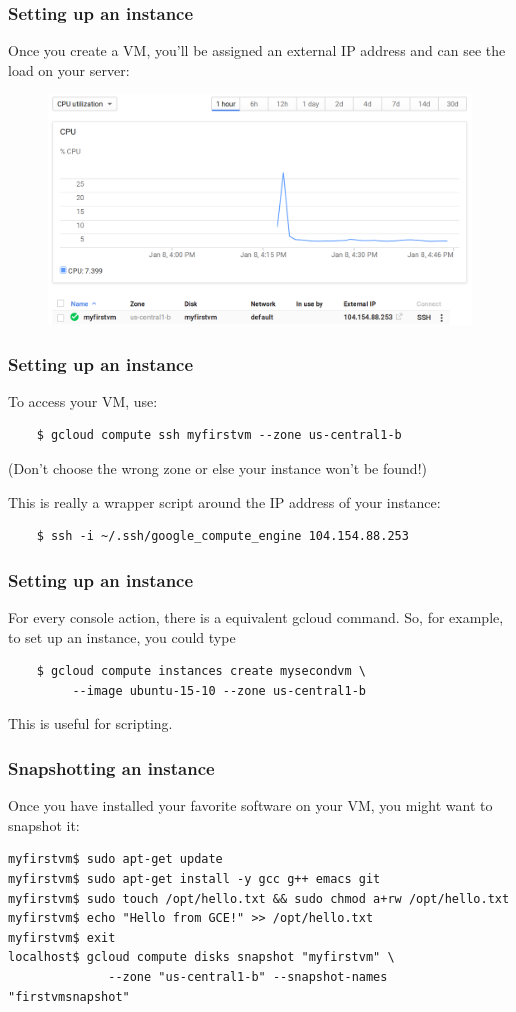 \documentclass[9pt]{beamer}
\begin{document}
\begin{frame}[fragile]
  \frametitle{Setting up an instance}
  Once you create a VM, you'll be assigned an external IP address and can see the load on your server:
  \begin{figure}
    \includegraphics[scale=0.2]{figures/VMUp.png}
  \end{figure}
\end{frame}

\begin{frame}[fragile]
  \frametitle{Setting up an instance}
  To access your VM, use:
  \begin{verbatim}
    $ gcloud compute ssh myfirstvm --zone us-central1-b
  \end{verbatim}
  (Don't choose the wrong zone or else your instance won't be found!)

  This is really a wrapper script around the IP address of your instance:
  \begin{verbatim}
    $ ssh -i ~/.ssh/google_compute_engine 104.154.88.253
  \end{verbatim}
\end{frame}

\begin{frame}[fragile]
  \frametitle{Setting up an instance}
  For every console action, there is a equivalent gcloud command. So, for example, to set up an instance, you could type
  \begin{verbatim}
    $ gcloud compute instances create mysecondvm \
         --image ubuntu-15-10 --zone us-central1-b
  \end{verbatim}
  This is useful for scripting.
\end{frame}

\begin{frame}[fragile]
  \frametitle{Snapshotting an instance}
  Once you have installed your favorite software on your VM, you might want to snapshot it:
  \begin{verbatim}
myfirstvm$ sudo apt-get update
myfirstvm$ sudo apt-get install -y gcc g++ emacs git
myfirstvm$ sudo touch /opt/hello.txt && sudo chmod a+rw /opt/hello.txt
myfirstvm$ echo "Hello from GCE!" >> /opt/hello.txt
myfirstvm$ exit
localhost$ gcloud compute disks snapshot "myfirstvm" \
              --zone "us-central1-b" --snapshot-names "firstvmsnapshot"
  \end{verbatim}  
\end{frame}
\end{document}
